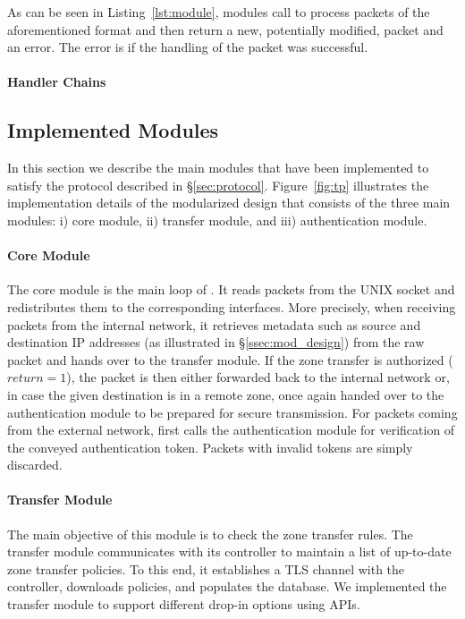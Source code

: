 As can be seen in Listing~\ref{lst:module}, modules call  to process packets
of the aforementioned format and then return a new, potentially modified, packet and an
error. The error is  if the handling of the packet was successful.

\paragraph{Handler Chains}
\label{ssec:chains}


\subsection{Implemented Modules}
\label{ssec:modules}

In this section we describe the main modules that have been implemented to satisfy
the protocol described in \S\ref{sec:protocol}. Figure~\ref{fig:tp} illustrates
the implementation details of the modularized \tp design that consists of the three
main modules: i) core module, ii) transfer module, and iii) authentication module.

\paragraph{Core Module}
The core module is the main loop of \tp. It reads packets from the UNIX socket and
redistributes them to the corresponding interfaces. More precisely, when receiving packets
from the internal network, it retrieves metadata such as source and destination
IP addresses (as illustrated in
\S\ref{ssec:mod_design}) from the raw packet and hands over to the transfer module.
If the zone transfer is authorized ($return=1$),
the packet is then either forwarded back to the internal network or, in case the given destination is in a remote zone, once again handed over to the authentication module to be prepared for secure transmission.
For packets coming from the external network, \tp first calls the authentication module for
verification of the conveyed authentication token. Packets with invalid tokens are simply discarded.

\paragraph{Transfer Module}
The main objective of this module is to check the zone transfer rules. The transfer
module communicates with its controller to maintain a list of up-to-date zone transfer policies.
To this end, it establishes a TLS channel with the controller, downloads policies,
and populates the database.
We implemented the transfer module to support different drop-in options using APIs.

